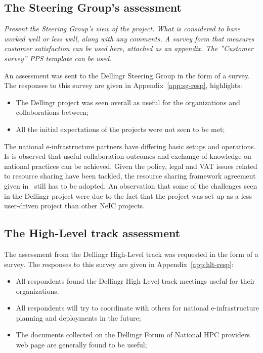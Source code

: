 \documentclass{article}
\newcommand{\dell}{Dellingr\xspace}
\newcommand{\einfra}{e-infrastructure\xspace}
\newcommand{\HLT}{High-Level track\xspace}
\begin{document}
\subsection{The Steering Group’s assessment}
{\it Present the Steering Group’s view of the project. What is considered to have worked well or less well, along with any comments.  A survey form that measures customer satisfaction can be used here, attached as an appendix. The ”Customer survey” PPS template can be used.}

An assessment was sent to the \dell Steering Group in the form of a survey.
The responses to this survey are given in Appendix~\ref{app:sg-resp}, highlights: %
\begin{itemize}
\item The \dell project was seen overall as useful for the organizations and collaborations between;
\item All the initial expectations of the projects were not seen to be met;
\end{itemize}

The national \einfra partners have differing basic setups and operations.
Is is observed that useful collaboration outcomes and exchange of knowledge on national practices can be achieved.
Given the policy, legal and VAT issues related to resource sharing have been tackled, the resource sharing
framework agreement given in~\cite{dellingr-p2-do5} still has to be adopted.
An observation that some of the challenges seen in the \dell project were due to the fact that the project was set up
as a less user-driven project than other NeIC projects.

\subsection{The \HLT assessment}

The assessment from the \dell \HLT was requested in the form of a survey.
The responses to this survey are given in Appendix~\ref{app:hlt-resp}:
\begin{itemize}
\item All respondents found the \dell \HLT meetings useful for their organizations.
\item All respondents will try to coordinate with others for national \einfra planning and deployments in the future;
\item The documents collected on the \dell Forum of National HPC providers web page are generally found to be useful;
\end{itemize}
\end{document}
